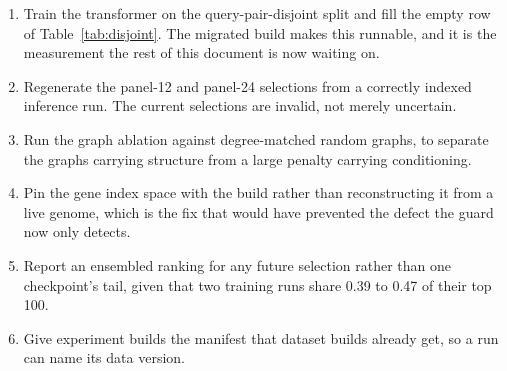 \begin{enumerate}
\item Train the transformer on the query-pair-disjoint split and fill the empty
  row of Table~\ref{tab:disjoint}. The migrated build makes this runnable, and it
  is the measurement the rest of this document is now waiting on.
\item Regenerate the panel-12 and panel-24 selections from a correctly indexed
  inference run. The current selections are invalid, not merely uncertain.
\item Run the graph ablation against degree-matched random graphs, to separate
  the graphs carrying structure from a large penalty carrying conditioning.
\item Pin the gene index space with the build rather than reconstructing it from
  a live genome, which is the fix that would have prevented the defect the guard
  now only detects.
\item Report an ensembled ranking for any future selection rather than one
  checkpoint's tail, given that two training runs share 0.39 to 0.47 of their
  top 100.
\item Give experiment builds the manifest that dataset builds already get, so a
  run can name its data version.
\end{enumerate}
